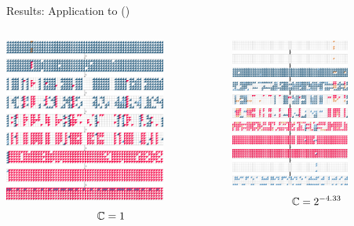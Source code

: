 \begin{frame}{Results: Application to ({\tiny\dllegend})}
\vspace{-0.6cm}
\begin{columns}
\begin{center}
\includegraphics[width=0.75\textwidth]{./figures/ascon_4r_v0.pdf}
\vspace{-0.5cm}
{\scriptsize \[\mathbb{C} = 1\]}
\end{center}
\begin{center}
\includegraphics[width=0.68\textwidth]{./figures/ascon_5r_v0.pdf}
\vspace{-0.5cm}
{\scriptsize \[\mathbb{C} = 2^{-4.33}\]}
\end{center}
\end{columns}
\end{frame}

